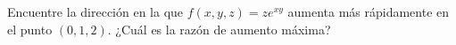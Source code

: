 \item Encuentre la dirección en la que $f(x, y, z) = ze^{xy}$ aumenta más rápidamente en el punto $(0, 1, 2)$. ¿Cuál es la razón de aumento máxima?
